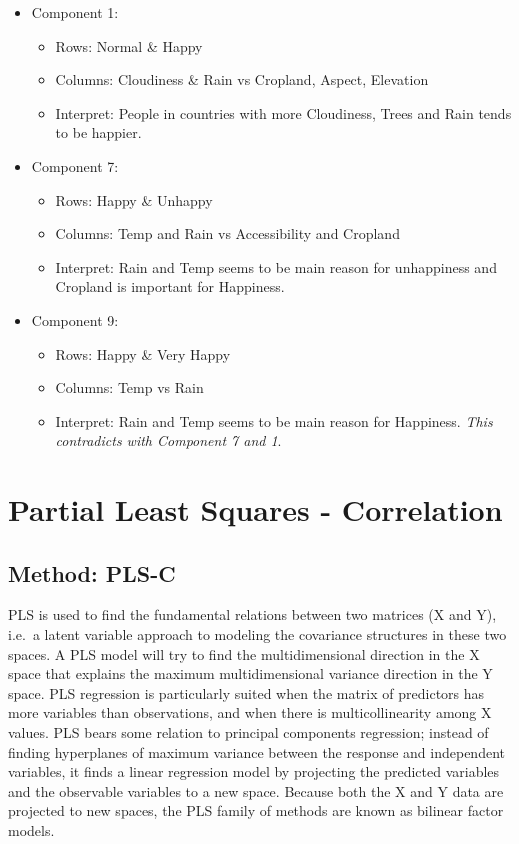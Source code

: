 \documentclass[]{book}
\providecommand{\tightlist}{%
  \setlength{\itemsep}{0pt}\setlength{\parskip}{0pt}}
\begin{document}
\begin{itemize}
\tightlist
\item
  Component 1:

  \begin{itemize}
  \tightlist
  \item
    Rows: Normal \& Happy
  \item
    Columns: Cloudiness \& Rain vs Cropland, Aspect, Elevation
  \item
    Interpret: People in countries with more Cloudiness, Trees and Rain
    tends to be happier.
  \end{itemize}
\item
  Component 7:

  \begin{itemize}
  \tightlist
  \item
    Rows: Happy \& Unhappy
  \item
    Columns: Temp and Rain vs Accessibility and Cropland
  \item
    Interpret: Rain and Temp seems to be main reason for unhappiness and
    Cropland is important for Happiness.
  \end{itemize}
\item
  Component 9:

  \begin{itemize}
  \tightlist
  \item
    Rows: Happy \& Very Happy
  \item
    Columns: Temp vs Rain
  \item
    Interpret: Rain and Temp seems to be main reason for Happiness.
    \emph{This contradicts with Component 7 and 1}.
  \end{itemize}
\end{itemize}

\hypertarget{partial-least-squares---correlation}{%
\chapter{Partial Least Squares -
Correlation}\label{partial-least-squares---correlation}}

\hypertarget{method-pls-c}{%
\section{Method: PLS-C}\label{method-pls-c}}

PLS is used to find the fundamental relations between two matrices (X
and Y), i.e.~a latent variable approach to modeling the covariance
structures in these two spaces. A PLS model will try to find the
multidimensional direction in the X space that explains the maximum
multidimensional variance direction in the Y space. PLS regression is
particularly suited when the matrix of predictors has more variables
than observations, and when there is multicollinearity among X values.
PLS bears some relation to principal components regression; instead of
finding hyperplanes of maximum variance between the response and
independent variables, it finds a linear regression model by projecting
the predicted variables and the observable variables to a new space.
Because both the X and Y data are projected to new spaces, the PLS
family of methods are known as bilinear factor models.
\end{document}
